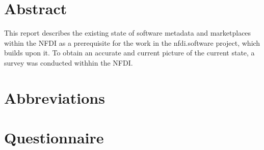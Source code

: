 \documentclass[headsepline,titlepage,twoside,12pt,toc=flat,headings=normal]{scrreprt}
\author{\theauthor}
\date{\thedate}
\title{\thetitle}
\subtitle{Deliverable 2.2}
\begin{document}
\maketitle
\imprint

\chapter*{Abstract}\label{ch:abstract}

This report describes the existing state of software metadata and marketplaces within the NFDI as a prerequisite for the work in the nfdi.software project, which builds upon it.
To obtain an accurate and current picture of the current state, a survey was conducted withhin the NFDI.

\chapter*{Abbreviations}%

\begin{acronym}
\end{acronym}

\setcounter{tocdepth}{1}%
\tableofcontents
{}


\chapter{Questionnaire}\label{ch:questionnaire}

\end{document}
